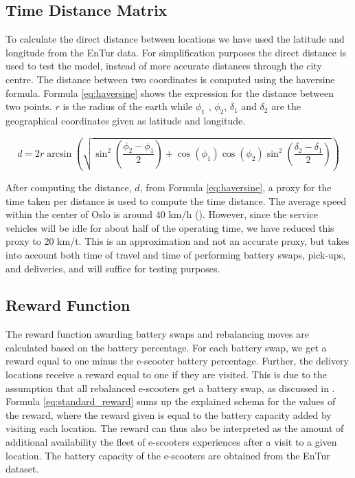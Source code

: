 \subsection{Time Distance Matrix}
To calculate the direct distance between locations we have used the latitude and longitude from the EnTur data. For simplification purposes the direct distance is used to test the model, instead of more accurate distances through the city centre. The distance between two coordinates is computed using the haversine formula. Formula \eqref{eq:haversine} shows the expression for the distance between two points. $r$ is the radius of the earth while $\phi_{1}$ , $\phi_{2}$, $\delta_{1}$ and $\delta_{2}$ are the geographical coordinates given as latitude and longitude.

\setcounter{equation}{0}
\begin{equation}\label{eq:haversine}
    d = 2r\arcsin\left(\sqrt{\sin^2\left(\frac{\phi_{2}-\phi_{1}}{2}\right)+ \cos(\phi_{1})\cos(\phi_{2})\sin^2\left(\frac{\delta_{2}-\delta_{1}}{2}\right)}\right)
\end{equation}

After computing the distance, $d$, from Formula \eqref{eq:haversine}, a proxy for the time taken per distance is used to compute the time distance. The average speed within the center of Oslo is around 40 km/h (\cite{fosli_effekter_1999}). However, since the service vehicles will be idle for about half of the operating time, we have reduced this proxy to 20 km/t. This is an approximation and not an accurate proxy, but takes into account both time of travel and time of performing battery swaps, pick-ups, and deliveries, and will suffice for testing purposes.

\subsection{Reward Function}\label{reward function}
The reward function awarding battery swaps and rebalancing moves are calculated based on the battery percentage. For each battery swap, we get a reward equal to one minus the e-scooter battery percentage. Further, the delivery locations receive a reward equal to one if they are visited. This is due to the assumption that all rebalanced e-scooters get a battery swap, as discussed in . Formula \eqref{eq:standard_reward} sums up the explained schema for the values of the reward, where the reward given is equal to the battery capacity added by visiting each location. The reward can thus also be interpreted as the amount of additional availability the fleet of e-scooters experiences after a visit to a given location. The battery capacity of the e-scooters are obtained from the EnTur dataset.

